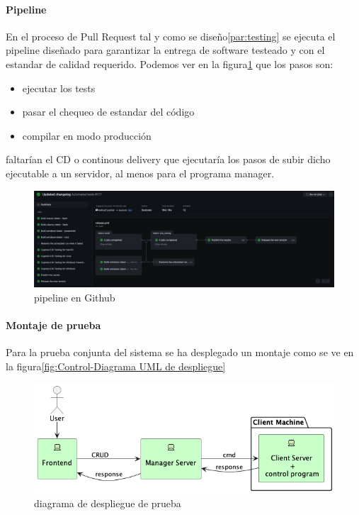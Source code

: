 
\paragraph{Pipeline}\label{par:pipeline}

En el proceso de Pull Request tal y como se diseño\ref{par:testing} se ejecuta el pipeline diseñado para garantizar la entrega de software testeado y con el estandar de calidad requerido. Podemos ver en la figura\ref{fig:githubActions} que los pasos son:

\begin{itemize}
    \item ejecutar los tests
    \item pasar el chequeo de estandar del código
    \item compilar en modo producción
\end{itemize}

faltarían el CD o continous delivery que ejecutaría los pasos de subir dicho ejecutable a un servidor, al menos para el programa manager.

\begin{figure}[H]
    \centering
    \includegraphics[height=0.2\textheight]{./part/Ejecucion/Seguimiento/PuestaAPunto/img/githubPipelines}
    \caption{pipeline en Github}\label{fig:githubActions}
\end{figure}

\paragraph{Montaje de prueba}\label{par:montaje}

Para la prueba conjunta del sistema se ha desplegado un montaje como se ve en la figura\ref{fig:Control-Diagrama UML de despliegue}

\begin{figure}[H]
    \centering
    \includegraphics[height=0.2\textheight]{./part/Ejecucion/Seguimiento/PuestaAPunto/img/deploy}
    \caption{diagrama de despliegue de prueba}\label{fig:despliegue de prueba}
\end{figure}

